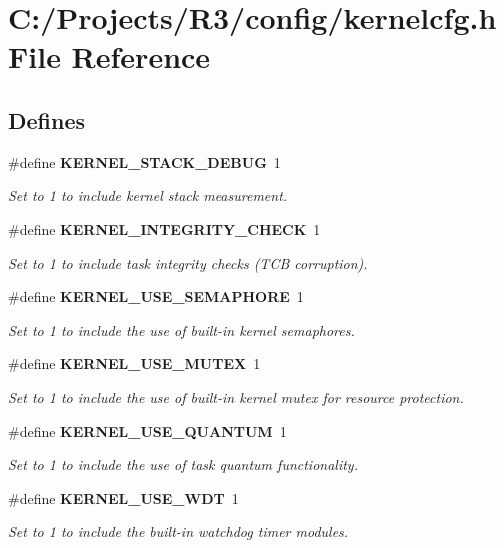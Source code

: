 \section{C:/Projects/R3/config/kernelcfg.h File Reference}
\label{kernelcfg_8h}
\subsection*{Defines}
\begin{DoxyCompactItemize}
\item 
\#define {\bf KERNEL\_\-STACK\_\-DEBUG}~1
\begin{DoxyCompactList}\small\item\em Set to 1 to include kernel stack measurement. \item\end{DoxyCompactList}\item 
\#define {\bf KERNEL\_\-INTEGRITY\_\-CHECK}~1
\begin{DoxyCompactList}\small\item\em Set to 1 to include task integrity checks (TCB corruption). \item\end{DoxyCompactList}\item 
\#define {\bf KERNEL\_\-USE\_\-SEMAPHORE}~1
\begin{DoxyCompactList}\small\item\em Set to 1 to include the use of built-\/in kernel semaphores. \item\end{DoxyCompactList}\item 
\#define {\bf KERNEL\_\-USE\_\-MUTEX}~1
\begin{DoxyCompactList}\small\item\em Set to 1 to include the use of built-\/in kernel mutex for resource protection. \item\end{DoxyCompactList}\item 
\#define {\bf KERNEL\_\-USE\_\-QUANTUM}~1
\begin{DoxyCompactList}\small\item\em Set to 1 to include the use of task quantum functionality. \item\end{DoxyCompactList}\item 
\#define {\bf KERNEL\_\-USE\_\-WDT}~1
\begin{DoxyCompactList}\small\item\em Set to 1 to include the built-\/in watchdog timer modules. \item\end{DoxyCompactList}\item 

\end{DoxyCompactItemize}
